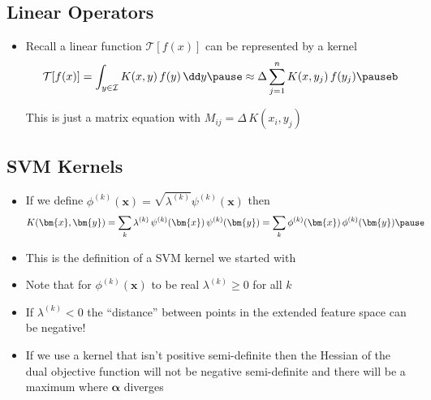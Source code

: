 
\begin{slide}
\section[-2]{Linear Operators}

\begin{PauseHighLight}
  \begin{itemize}\squeeze
  \item Recall a linear function $\mathcal{T}[f(x)]$ can be
    represented by a kernel
    \begin{align*}
      \mathcal{T}[f(x)] = \int_{y\in\mathcal{I}} K(x,y)\,f(y)\,\dd
      y\pause \approx \Delta \sum_{j=1}^n K(x, y_j)\, f(y_j)\pauseb
    \end{align*}
    \begin{center}
      \pauseb
    \end{center}
  This is just a matrix equation with $M_{ij}=\Delta\,K(x_i, y_j)$\pause
  \end{itemize}
\end{PauseHighLight}

\end{slide}



\begin{slide}
\section[-2]{SVM Kernels}

\begin{PauseHighLight}
  \begin{itemize}
  \item If we define $\phi^{(k)}(\bm{x}) = \sqrt{\lambda^{(k)}} \psi^{(k)}(\bm{x})$
    then
    \begin{align*}
      K(\bm{x}, \bm{y}) &= \sum_k \lambda^{(k)}\,
      \psi^{(k)}(\bm{x})\,\psi^{(k)}(\bm{y})
      = \sum_k \phi^{(k)}(\bm{x})\,\phi^{(k)}(\bm{y})\pause
    \end{align*}
  \item This is the definition of a SVM kernel we started with\pause
  \item Note that for $\phi^{(k)}(\bm{x})$ to be real $\lambda^{(k)}\geq 0$ for
    all $k$\pause
  \item If $\lambda^{(k)} < 0$ the ``distance'' between points in the
    extended feature space can be negative!\pause
  \item If we use a kernel that isn't positive semi-definite then the
    Hessian of the dual objective function will not be negative
    semi-definite and there will be a maximum where $\bm{\alpha}$
    diverges\pause
  \end{itemize}
\end{PauseHighLight}

\end{slide}



